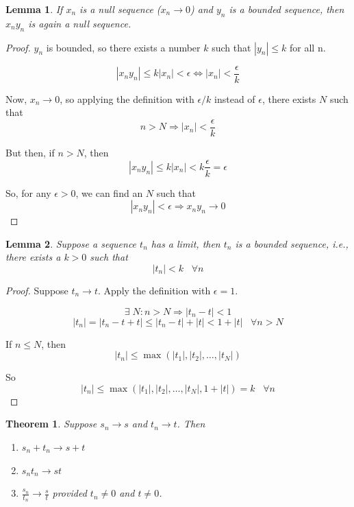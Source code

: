 \documentclass[12pt]{scrbook}
\newtheorem{lemma}{Lemma}[section]
\newtheorem{theorem}{Theorem}[section]
\begin{document}

\begin{lemma}
\label{lemma-lim-2}
If $x_n$ is a null sequence ($x_n \rightarrow 0$) and $y_n$ is a bounded sequence, then $x_n y_n$ is again a null sequence.
\end{lemma}

\begin{proof}
$y_n$ is bounded, so there exists a number $k$ such that $|y_n| \le k$ for all n.

\[ \left| x_n y_n \right| \le k|x_n| < \epsilon \Leftrightarrow |x_n| < \frac{\epsilon}{k} \]

Now, $x_n \rightarrow 0$, so applying the definition with $\epsilon/k$ instead of $\epsilon$, there exists $N$ such that
\[ n > N \Rightarrow |x_n| < \frac{\epsilon}{k} \]

But then, if $n > N$, then
\[ \left| x_n y_n \right| \le k|x_n| < k \frac{\epsilon}{k} = \epsilon \]

So, for any $\epsilon > 0$, we can find an $N$ such that
\[ \left| x_n y_n \right| < \epsilon \Rightarrow x_n y_n \rightarrow 0 \]

\end{proof}


\begin{lemma}
\label{lemma-lim-3}
Suppose a sequence $t_n$ has a limit, then $t_n$ is a bounded sequence, i.e., there exists a $k > 0$ such that 
\[ |t_n| < k \;\;\; \forall n \]
\end{lemma}

\begin{proof}
Suppose $t_n \rightarrow t$. Apply the definition with $\epsilon = 1$.

\[ \exists \; N: n > N \Rightarrow \left| t_n - t \right| < 1 \]
\[ |t_n| = \left| t_n - t + t \right| \le \left| t_n - t \right| + |t| < 1 + |t| \;\;\; \forall n > N \]

If $n \le N$, then 
\[ | t_n | \le \max\left( |t_1|, |t_2|, \ldots , |t_N| \right) \]

So
\[ |t_n| \le \max\left( |t_1|, |t_2|, \ldots , |t_N|, 1 + |t| \right) = k \;\;\; \forall n \]

\end{proof}


\begin{theorem}
Suppose $s_n \rightarrow s$ and $t_n \rightarrow t$. Then
\begin{enumerate}
\item $ s_n + t_n \rightarrow s + t $
\item $ s_n t_n \rightarrow s t $
\item $ \frac{s_n}{t_n} \rightarrow \frac{s}{t} $ provided $t_n \ne 0$ and $t \ne 0$.
\end{enumerate}
\end{theorem}
\end{document}
